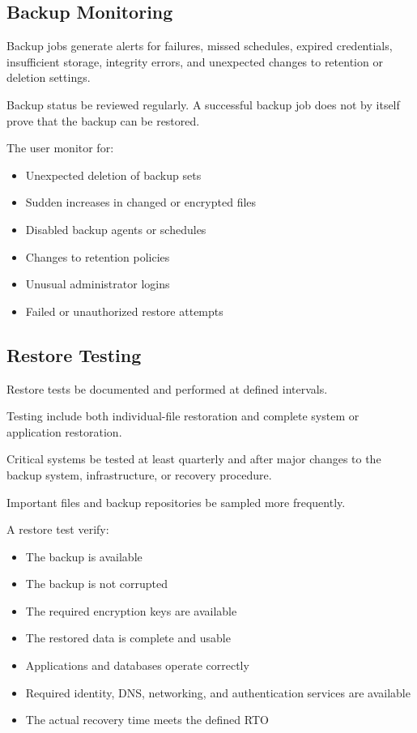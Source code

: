 \subsection{Backup Monitoring}

Backup jobs \must{} generate alerts for failures, missed schedules, expired credentials, insufficient storage, integrity errors, and unexpected changes to retention or deletion settings.

Backup status \should{} be reviewed regularly. A successful backup job does not by itself prove that the backup can be restored.

The user \should{} monitor for:
\begin{itemize}
    \item Unexpected deletion of backup sets
    \item Sudden increases in changed or encrypted files
    \item Disabled backup agents or schedules
    \item Changes to retention policies
    \item Unusual administrator logins
    \item Failed or unauthorized restore attempts
\end{itemize}

\subsection{Restore Testing}

Restore tests \must{} be documented and performed at defined intervals.

Testing \should{} include both individual-file restoration and complete system or application restoration.

Critical systems \should{} be tested at least quarterly and after major changes to the backup system, infrastructure, or recovery procedure.

Important files and backup repositories \should{} be sampled more frequently.

A restore test \must{} verify:
\begin{itemize}
    \item The backup is available
    \item The backup is not corrupted
    \item The required encryption keys are available
    \item The restored data is complete and usable
    \item Applications and databases operate correctly
    \item Required identity, DNS, networking, and authentication services are available
    \item The actual recovery time meets the defined RTO
\end{itemize}

